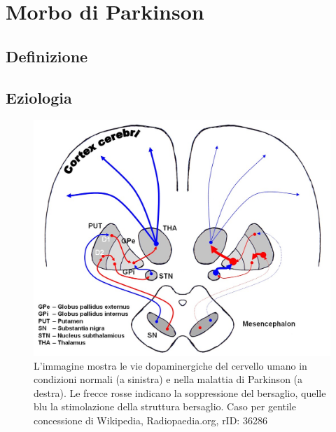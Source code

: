 \section{Morbo di Parkinson}

\subsection{Definizione}

\subsection{Eziologia}

\begin{figure}[h]
	\centering
	\includegraphics[width=0.5\linewidth]{FileAusiliari/Immagini/degenerative/dopamine-in-parkinsons-disease-illustration}
	\caption{L'immagine mostra le vie dopaminergiche del cervello umano in condizioni normali (a sinistra) e nella malattia di Parkinson (a destra). Le frecce rosse indicano la soppressione del bersaglio, quelle blu la stimolazione della struttura bersaglio. Caso per gentile concessione di Wikipedia, Radiopaedia.org, rID: 36286}
	\label{fig:dopamine-in-parkinsons-disease-illustration}
\end{figure}


